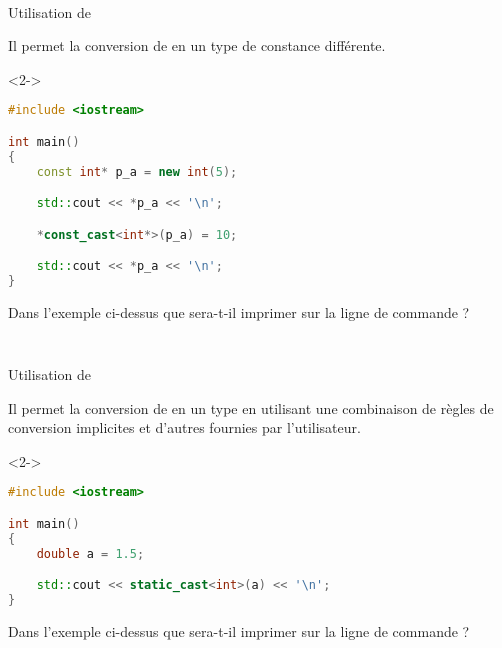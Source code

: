\documentclass{cppcourses}
\begin{document}
\begin{frame}[fragile]

\frametitle{}

\begin{myfigure}
 \\
\caption{Utilisation de }
\end{myfigure}

Il permet la conversion de \mykeyword{\textcolor{orange}{expression}} en un type \mykeyword{\textcolor{blue}{type cible}} de constance différente.

\begin{example}<2->

\begin{lstlisting}[language = c++]
#include <iostream>

int main()
{
    const int* p_a = new int(5);

    std::cout << *p_a << '\n';

    *const_cast<int*>(p_a) = 10;

    std::cout << *p_a << '\n';
}
\end{lstlisting}

Dans l'exemple ci-dessus que sera-t-il imprimer sur la ligne de commande ?


\end{example}

\end{frame}

\begin{frame}[fragile]

\frametitle{}

\begin{myfigure}
 \\
\caption{Utilisation de }
\end{myfigure}

Il permet la conversion de \mykeyword{\textcolor{orange}{expression}} en un type \mykeyword{\textcolor{blue}{type cible}} en utilisant une combinaison de règles de conversion implicites et d'autres fournies par l'utilisateur.

\begin{example}<2->

\begin{lstlisting}[language = c++]
#include <iostream>

int main()
{
    double a = 1.5;

    std::cout << static_cast<int>(a) << '\n';
}
\end{lstlisting}

Dans l'exemple ci-dessus que sera-t-il imprimer sur la ligne de commande ?


\end{example}

\end{frame}
\end{document}
